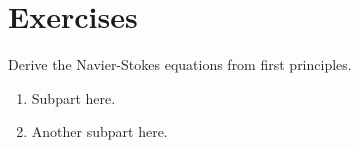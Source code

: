 \section*{Exercises}
\begin{exercise} 
Derive the Navier-Stokes equations from first principles.
\begin{enumerate}
\item Subpart here.
\item Another subpart here.
\end{enumerate}
\end{exercise}



